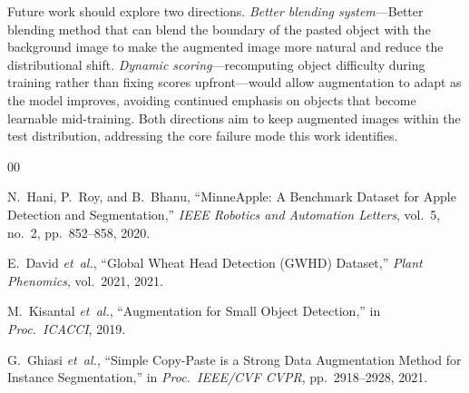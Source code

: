\documentclass[conference]{IEEEtran}
\begin{document}
Future work should explore two directions.
\textit{Better blending system}---Better blending method 
that can blend the boundary of the pasted object with the background
image to make the augmented image more natural and reduce the distributional shift.
\textit{Dynamic scoring}---recomputing object difficulty during
training rather than fixing scores upfront---would allow
augmentation to adapt as the model improves, avoiding continued
emphasis on objects that become learnable mid-training.
Both directions aim to keep augmented images within the test
distribution, addressing the core failure mode this work identifies.

\begin{thebibliography}{00}

N.~Hani, P.~Roy, and B.~Bhanu,
``MinneApple: A Benchmark Dataset for Apple Detection and
Segmentation,''
\textit{IEEE Robotics and Automation Letters},
vol.~5, no.~2, pp.~852--858, 2020.

E.~David \textit{et~al.},
``Global Wheat Head Detection (GWHD) Dataset,''
\textit{Plant Phenomics}, vol.~2021, 2021.

M.~Kisantal \textit{et~al.},
``Augmentation for Small Object Detection,''
in \textit{Proc.\ ICACCI}, 2019.

G.~Ghiasi \textit{et~al.},
``Simple Copy-Paste is a Strong Data Augmentation Method
for Instance Segmentation,''
in \textit{Proc.\ IEEE/CVF CVPR}, pp.~2918--2928, 2021.

\end{thebibliography}
\end{document}
